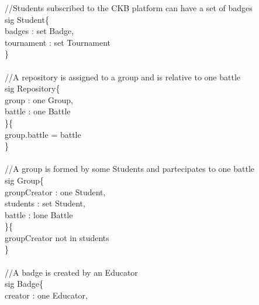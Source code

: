 \documentclass{article}
\begin{document}
{\color{gray}
//Students subscribed to the CKB platform can have a set of badges\\
\color{blue}
sig
\color{black}
Student\{\\
\-\hspace{1cm}    badges : \color{blue} set \color{black} Badge,\\
\-\hspace{1cm}    tournament : \color{blue} set \color{black} Tournament\\
\}\\
\color{gray}
\\
//A repository is assigned to a group and is relative to one battle\\
\color{blue}
sig
\color{black}
Repository\{\\
\-\hspace{1cm}    group : \color{blue} one \color{black} Group,\\
\-\hspace{1cm}    battle : \color{blue} one \color{black} Battle\\
\}\{\\
\-\hspace{1cm}    group.battle \color{blue} = \color{black} battle\\
\}\\
\\
\color{gray}
//A group is formed by some Students and partecipates to one battle\\
\color{blue}
sig
\color{black}
Group\{\\
\-\hspace{1cm}    groupCreator : \color{blue} one \color{black} Student,\\
\-\hspace{1cm}    students : \color{blue} set \color{black} Student,\\
\-\hspace{1cm}    battle : \color{blue} lone \color{black} Battle\\
\}\{\\
\-\hspace{1cm}    groupCreator \color{blue} not in \color{black} students	\\
\}\\
\\
\color{gray}
//A badge is created by an Educator\\
\color{blue}
sig
\color{black}
Badge\{\\
\-\hspace{1cm}    creator : \color{blue} one \color{black} Educator,\\
}
\end{document}
